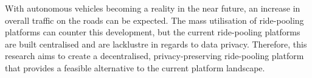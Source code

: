 
With autonomous vehicles becoming a reality in the near future, an increase in overall traffic on the roads can be expected. The mass utilisation of ride-pooling platforms can counter this development, but the current ride-pooling platforms are built centralised and are lacklustre in regards to data privacy. Therefore, this research aims to create a decentralised, privacy-preserving ride-pooling platform that provides a feasible alternative to the current platform landscape.